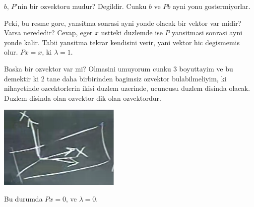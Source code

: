 \documentclass[12pt,fleqn]{article}\usepackage{../common}
\begin{document}
$b$, $P$'nin bir ozvektoru mudur? Degildir. Cunku $b$ ve $Pb$ ayni yonu
gostermiyorlar. 

Peki, bu resme gore, yansitma sonrasi ayni yonde olacak bir vektor var
midir? Varsa nerededir? Cevap, eger $x$ ustteki duzlemde ise $P$ yansitmasi
sonrasi ayni yonde kalir. Tabii yansitma tekrar kendisini verir, yani
vektor hic degismemis olur. $Px = x$, ki $\lambda = 1$. 

Baska bir ozvektor var mi? Olmasini umuyorum cunku 3 boyuttayim ve bu
demektir ki 2 tane daha birbirinden bagimsiz ozvektor bulabilmeliyim, ki
nihayetinde ozcektorlerin ikisi duzlem uzerinde, ucuncusu duzlem disinda
olacak. Duzlem disinda olan ozvektor dik olan ozvektordur. 

\includegraphics[height=4cm]{21_2.png}

Bu durumda $Px = 0$, ve $\lambda = 0$. 
\end{document}
